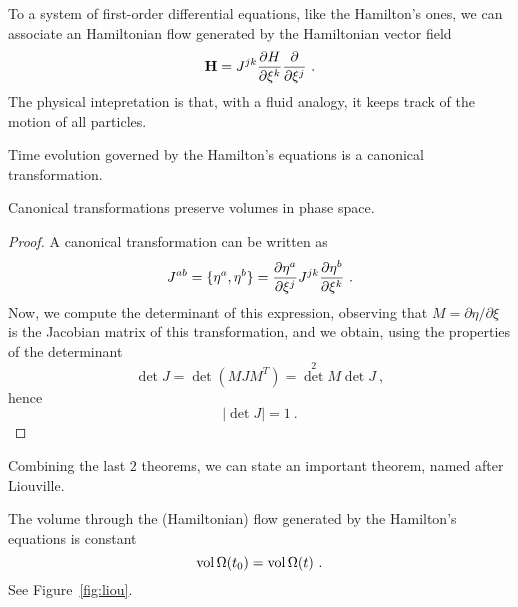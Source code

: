     To a system of first-order differential equations, like the Hamilton's ones, we can associate an Hamiltonian flow generated by the Hamiltonian vector field
    \begin{equation*}
        \mathbf H = J^{jk} \frac{\partial H}{\partial\xi^k} \frac{\partial}{\partial\xi^j} ~.
    \end{equation*}
    The physical intepretation is that, with a fluid analogy, it keeps track of the motion of all particles.
    \begin{theorem}
        Time evolution governed by the Hamilton's equations is a canonical transformation.
    \end{theorem}
    \begin{theorem}
        Canonical transformations preserve volumes in phase space.
    \end{theorem}
    \begin{proof}
        A canonical transformation can be written as 
        \begin{equation*}
            J^{ab} = \{\eta^a, \eta^b\} = \frac{\partial\eta^a}{\partial\xi^j} J^{jk} \frac{\partial\eta^b}{\partial\xi^k} ~.
        \end{equation*}
        Now, we compute the determinant of this expression, observing that $M = \partial \eta / \partial \xi$ is the Jacobian matrix of this transformation, and we obtain, using the properties of the determinant
        \begin{equation*}
            \det J = \det (M J M^T) = \det^2 M \det J ~,
        \end{equation*}
        hence 
        \begin{equation*}
            |\det J| = 1 ~.
        \end{equation*}
    \end{proof}
    Combining the last $2$ theorems, we can state an important theorem, named after Liouville. 
    \begin{theorem}[Liouville]
        The volume through the (Hamiltonian) flow generated by the Hamilton's equations is constant
        \begin{equation*}
            \operatorname{vol} \Omega(t_0) = \operatorname{vol} \Omega(t) ~.
        \end{equation*}
        See Figure~\ref{fig:liou}.
    \end{theorem}
